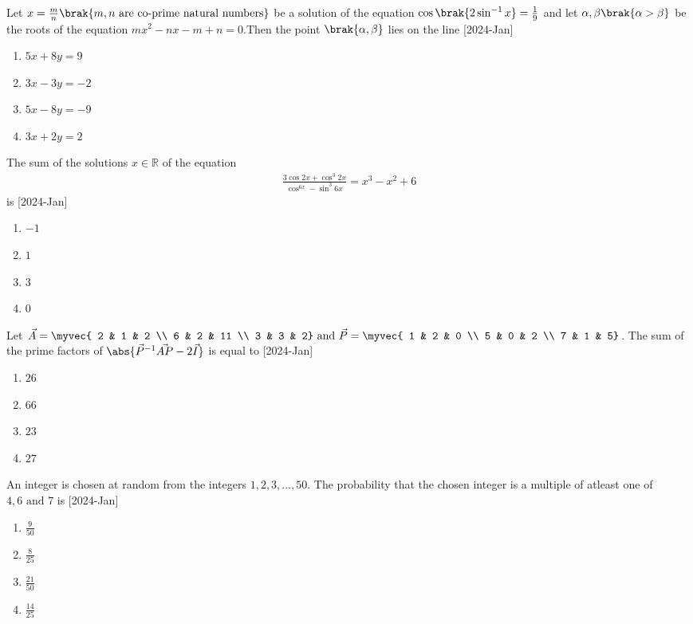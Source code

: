 \item Let $x = \frac{m}{n} \brak{ m , n \text{ are co-prime natural numbers}}$ be a solution of the equation $\cos \brak{2\sin^{-1}x}=\frac{1}{9}$ and let $\alpha,\beta \brak{\alpha > \beta}$ be the roots of the equation $mx^2 - nx - m + n=0$.Then the point $\brak{\alpha,\beta}$ lies on the line \hfill[2024-Jan]
	\begin{enumerate}
		\item $5x + 8y = 9$
		\item $3x - 3y = -2$
		\item $5x - 8y = -9$
		\item $3x + 2y = 2$
	\end{enumerate}
\item The sum of the solutions $x \in \mathbb{R}$ of the equation 
	\begin{align}
		\frac{3\cos{2x}+\cos^3{2x}}{\cos^{6x}-\sin^3{6x}} = x^3 - x^2 + 6
	\end{align}
	is \hfill[2024-Jan]
	\begin{multicols}{2}
		\begin{enumerate}
			\item $-1$
			\item $1$
			\item $3$
			\item $0$
		\end{enumerate}
	\end{multicols}
	\item Let $\vec{A} = \myvec{ 2 & 1 & 2 \\ 6 & 2 & 11 \\ 3 & 3 & 2} \text{ and } \vec{P} = \myvec{ 1 & 2 & 0 \\ 5 & 0 & 2 \\ 7 & 1 & 5} $. The sum of the prime factors of $\abs{\vec{P}^{-1}\vec{AP}-2\vec{I}}$ is equal to \hfill[2024-Jan]
	\begin{multicols}{2}
		\begin{enumerate}
			\item $26$
			\item $66$
			\item $23$
			\item $27$
		\end{enumerate}
	\end{multicols}
\item An integer is chosen at random from the integers $ 1 , 2 , 3 ,\dots , 50$. The probability that the chosen integer is a multiple of atleast one of $ 4 , 6 \text{ and } 7$ is \hfill[2024-Jan]
	\begin{enumerate}
		\item $\frac{9}{50}$\\
		\item $\frac{8}{25}$\\
		\item $\frac{21}{50}$\\
		\item $\frac{14}{25}$
	\end{enumerate}
